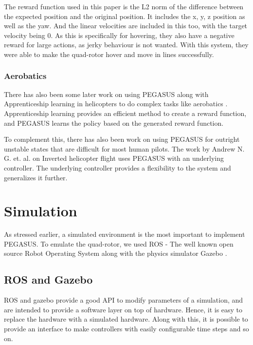 \documentclass[BTech]{iitmdiss}
\begin{document}
The reward function used in this paper is the L2 norm of the difference between the expected position and the original position. It includes the x, y, z position as well as the yaw. And the linear velocities are included in this too, with the target velocity being 0. As this is specifically for hovering, they also have a negative reward for large actions, as jerky behaviour is not wanted. With this system, they were able to make the quad-rotor hover and move in lines successfully.

\subsection{Aerobatics}

There has also been some later work on using PEGASUS along with Apprenticeship learning in helicopters to do complex tasks like aerobatics \cite{ApprenticeshipHelicopterAerobatics}. Apprenticeship learning provides an efficient method to create a reward function, and PEGASUS learns the policy based on the generated reward function.

To complement this, there has also been work on using PEGASUS for outright unstable states that are difficult for most human pilots. The work by Andrew N. G. et. al. on Inverted helicopter flight \cite{InvertedHelicopterFlight} uses PEGASUS with an underlying controller. The underlying controller provides a flexibility to the system and generalizes it further.


\chapter{Simulation}

As stressed earlier, a simulated environment is the most important to implement PEGASUS. To emulate the quad-rotor, we used ROS \cite{ROS} - The well known open source Robot Operating System along with the physics simulator Gazebo \cite{Gazebo}.

\section{ROS and Gazebo}

ROS and gazebo provide a good API to modify parameters of a simulation, and are intended to provide a software layer on top of hardware. Hence, it is easy to replace the hardware with a simulated hardware. Along with this, it is possible to provide an interface to make controllers with easily configurable time steps and so on.
\end{document}

